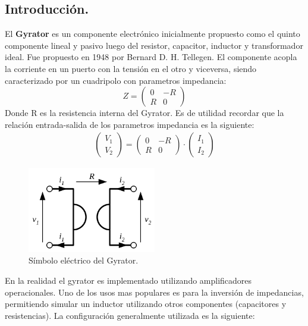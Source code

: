 
%
%


\subsection{Introducción.}
El \textbf{Gyrator} es un componente electrónico inicialmente propuesto como el quinto componente lineal y pasivo luego del resistor, capacitor, inductor y transformador ideal. Fue propuesto en 1948 por Bernard D. H. Tellegen. El componente acopla la  corriente en un puerto con la tensión en el otro y viceversa, siendo caracterizado por un cuadripolo con parametros impedancia:
$$ Z= \left(\begin{matrix}0&-R\\R&0\end{matrix}\right) $$
Donde R es la resistencia interna del Gyrator.
Es de utilidad recordar que la relación entrada-salida de los parametros impedancia es la siguiente:
\begin{align} \left(\begin{matrix}V_1\\V_2\end{matrix}\right) =   \left(\begin{matrix}0&-R\\R&0\end{matrix}\right)  \cdot \left(\begin{matrix}I_1\\I_2\end{matrix}\right) \end{align}
\begin{figure}[H]	
	\centering
	\includegraphics[width=0.5\textwidth]{ImagenesEj2/gyratorsimb.png}
	\caption{Símbolo eléctrico del Gyrator.}
	\label{fig:gyrsimb}
\end{figure}
En la realidad el gyrator es implementado utilizando amplificadores operacionales. Uno de los usos mas populares es para la inversión de impedancias, permitiendo simular un inductor utilizando otros componentes (capacitores y resistencias). La configuración generalmente utilizada es la siguiente:
